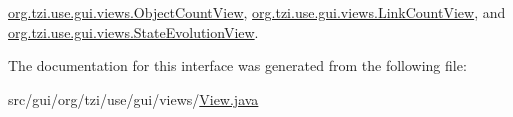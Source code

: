 \hyperlink{classorg_1_1tzi_1_1use_1_1gui_1_1views_1_1_object_count_view_a38ceb767fb87749cafc6bfeb39f9acd0}{org.\-tzi.\-use.\-gui.\-views.\-Object\-Count\-View}, \hyperlink{classorg_1_1tzi_1_1use_1_1gui_1_1views_1_1_link_count_view_a3ec5cc319739e5cc4ec712db777de98e}{org.\-tzi.\-use.\-gui.\-views.\-Link\-Count\-View}, and \hyperlink{classorg_1_1tzi_1_1use_1_1gui_1_1views_1_1_state_evolution_view_acc88b5a8c7c30deb69f439c31962cd8b}{org.\-tzi.\-use.\-gui.\-views.\-State\-Evolution\-View}.



The documentation for this interface was generated from the following file\-:\begin{DoxyCompactItemize}
\item 
src/gui/org/tzi/use/gui/views/\hyperlink{_view_8java}{View.\-java}\end{DoxyCompactItemize}
